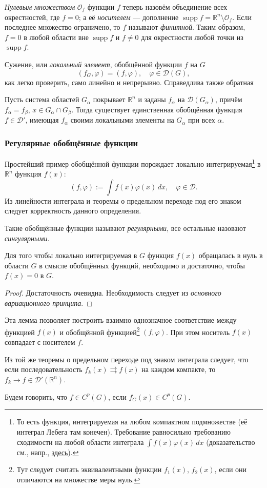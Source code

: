 \emph{Нулевым множеством} $ \mathcal O_f $ функции $ f $ теперь назовём объединение всех окрестностей, где $ f
= 0$; а её \emph{носителем} --- дополнение $ \operatorname{supp} f = \mathbb R^n
\setminus\mathcal O_f$. Если последнее множество ограничено, то $ f $ называют
\emph{финитной}. Таким образом, $ f = 0 $ в любой области вне $ \operatorname{supp} f $
и $ f\neq 0 $ для окрестности любой точки из $ \operatorname{supp}f $.

Сужение, или \emph{локальный элемент}, обобщённой функции $ f $ на $ G $  
\[
  (f_G, \varphi) = (f, \varphi), \quad \varphi \in\mathcal D(G),
\]
как легко проверить, само линейно и непрерывно. Справедлива также обратная
\begin{theorem}
  Пусть система областей $ G_\alpha $ покрывает $ \mathbb R^n $ и заданы $
  f_\alpha $ на $ \mathcal D(G_\alpha) $, причём $ f_\alpha = f_\beta $, $ x \in
  G_\alpha \cap G_\beta$. Тогда существует единственная обобщённая функция $ f
  \in\mathcal D' $, имеющая $ f_\alpha $ своими локальными элементы на $
  G_\alpha $ при всех $ \alpha $.
\end{theorem}

\subsubsection{Регулярные обобщённые функции}
Простейший пример обобщённой функции порождает локально
интегрируемая\footnote{То есть функция, интегрируемая на
любом компактном подмножестве (её интеграл Лебега там конечен). Требование
равносильно требованию сходимости на любой области интеграла $ \int f(x)\varphi(x)\,dx $
(доказательство см., напр.,
\href{https://en.wikipedia.org/wiki/Locally_integrable_function}{здесь}).} в $ \mathbb R^n
$ функция $ f(x) $: 
\[
  (f,\varphi) := \int f(x)\varphi(x)\,dx, \quad \varphi \in \mathcal D.
\]
Из линейности интеграла и теоремы о предельном переходе под его знаком следует
корректность данного определения.

Такие обобщённые функции называют \emph{регулярными}, все остальные назовают
\emph{сингулярными}.

\begin{theorem}
  Для того чтобы локально интегрируемая в $ G $ функция $ f(x) $ обращалась в
  нуль в области $ G $ в смысле обобщённых функций, необходимо и достаточно,
  чтобы $ f(x) = 0 $ в $ G $.
\end{theorem}
\begin{proof} Достаточность очевидна. Необходимость следует из \emph{основного
  вариационного принципа}.
\end{proof}
Эта лемма позволяет построить взаимно однозначное соответствие между функцией $
f(x)$ и обобщённой функцией\footnote{Тут следует считать эквивалентными функции
$ f_1(x) $, $ f_2(x) $, если они отличаются на множестве меры нуль.} $ (f, \varphi) $. При этом носитель $ f(x) $
совпадает с носителем $ f $.

Из той же теоремы о предельном переходе под знаком интеграла следует, что если
последовательность $ f_k(x) \rightrightarrows f(x)$ на каждом компакте, то $ f_k \to f \in
\mathcal D'(\mathbb R^n) $.

Будем говорить, что $ f \in C^p(G) $, если $ f_G(x) \in C^p(G) $.
